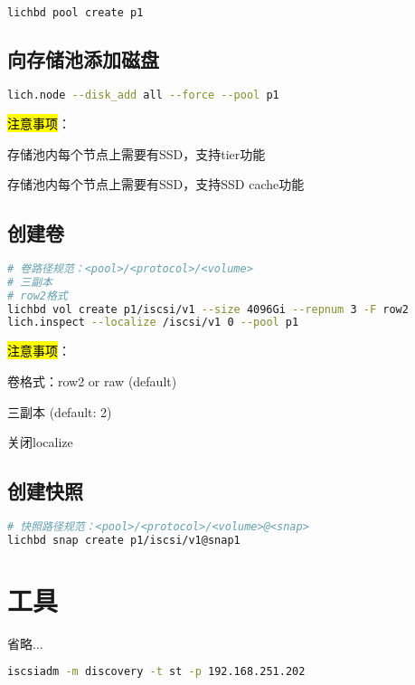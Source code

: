 \begin{lstlisting}[language=bash]
lichbd pool create p1
\end{lstlisting}

\subsection{向存储池添加磁盘}

\begin{lstlisting}[language=bash]
lich.node --disk_add all --force --pool p1
\end{lstlisting}

\hl{注意事项}：
\begin{compactenum}
\item 存储池内每个节点上需要有SSD，支持tier功能
\item 存储池内每个节点上需要有SSD，支持SSD cache功能
\end{compactenum}

\subsection{创建卷}

\begin{lstlisting}[language=bash]
# 卷路径规范：<pool>/<protocol>/<volume>
# 三副本
# row2格式
lichbd vol create p1/iscsi/v1 --size 4096Gi --repnum 3 -F row2
lich.inspect --localize /iscsi/v1 0 --pool p1
\end{lstlisting}

\hl{注意事项}：
\begin{compactenum}
\item 卷格式：row2 or raw (default)
\item 三副本 (default: 2)
\item 关闭localize
\end{compactenum}

\subsection{创建快照}

\begin{lstlisting}[language=bash]
# 快照路径规范：<pool>/<protocol>/<volume>@<snap>
lichbd snap create p1/iscsi/v1@snap1
\end{lstlisting}

\section{工具}

省略...

\begin{lstlisting}[language=bash]
iscsiadm -m discovery -t st -p 192.168.251.202
\end{lstlisting}

